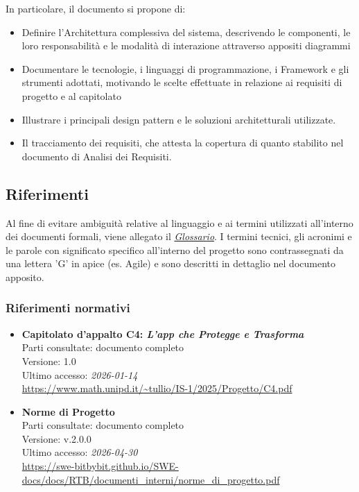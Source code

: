 \documentclass[a4paper,12pt]{article}
\begin{document}
In particolare, il documento si propone di:

\begin{itemize}
    \item Definire l'Architettura complessiva del sistema, descrivendo le componenti, le loro responsabilità e le modalità di interazione attraverso appositi diagrammi
    
    \item Documentare le tecnologie, i linguaggi di programmazione, i Framework e gli strumenti adottati, motivando le scelte effettuate in relazione ai requisiti di progetto e al capitolato
    
    \item Illustrare i principali design pattern e le soluzioni architetturali utilizzate.
        
    \item Il tracciamento dei requisiti, che attesta la copertura di quanto stabilito nel documento di Analisi dei Requisiti.
\end{itemize}


\subsection{Riferimenti} \label{sec:riferimenti}



Al fine di evitare ambiguità relative al linguaggio e ai termini utilizzati all'interno dei documenti formali, viene allegato il \href{https://swe-bitbybit.github.io/SWE-docs/docs/RTB/documenti_interni/Glossario.pdf}{\textit{Glossario}}.
I termini tecnici, gli acronimi e le parole con significato specifico all'interno del progetto sono contrassegnati da una lettera 'G' in apice (es. Agile) e sono descritti in dettaglio nel documento apposito.

\subsubsection{Riferimenti normativi}\label{sec:riferimenti_normativi}
\begin{itemize}
\item \textbf{Capitolato d'appalto C4: \emph{L'app che Protegge e Trasforma}}\\
Parti consultate: documento completo\\
Versione: 1.0\\
Ultimo accesso: \textit{2026-01-14}\\
\url{https://www.math.unipd.it/~tullio/IS-1/2025/Progetto/C4.pdf}

\item \textbf{Norme di Progetto}\\
Parti consultate: documento completo\\
Versione: v.2.0.0\\
Ultimo accesso: \textit{2026-04-30}\\
\url{https://swe-bitbybit.github.io/SWE-docs/docs/RTB/documenti_interni/norme_di_progetto.pdf}
\end{itemize}
\end{document}
